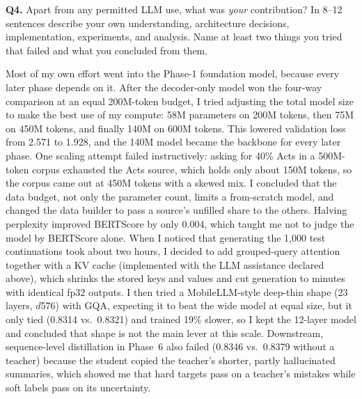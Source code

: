 \documentclass[11pt, oneside]{article}
\begin{document}
\noindent
\textbf{Q4.} Apart from any permitted LLM use, what was \emph{your} contribution? In 8--12 sentences describe your own understanding, architecture decisions, implementation, experiments, and analysis. Name at least two things you tried that failed and what you concluded from them.
\medskip

\noindent
Most of my own effort went into the Phase-1 foundation model, because every later phase depends on it. After the
decoder-only model won the four-way comparison at an equal 200M-token budget, I tried adjusting the total model size
to make the best use of my compute: 58M parameters on 200M tokens, then 75M on 450M tokens, and finally 140M on 600M
tokens. This lowered validation loss from 2.571 to 1.928, and the 140M model became the backbone for every later phase.
One scaling attempt failed instructively: asking for 40\% Acts in a 500M-token corpus exhausted the Acts source, which
holds only about 150M tokens, so the corpus came out at 450M tokens with a skewed mix. I concluded that the data
budget, not only the parameter count, limits a from-scratch model, and changed the data builder to pass a source's
unfilled share to the others. Halving perplexity improved BERTScore by only 0.004, which taught me not to judge the
model by BERTScore alone. When I noticed that generating the 1{,}000 test continuations took about two hours, I
decided to add grouped-query attention together with a KV cache (implemented with the LLM assistance declared above),
which shrinks the stored keys and values and cut generation to minutes with identical fp32 outputs. I then tried a
MobileLLM-style deep-thin shape (23 layers, $d$576) with GQA, expecting it to beat the wide model at equal size, but it
only tied (0.8314 vs.\ 0.8321) and trained 19\% slower, so I kept the 12-layer model and concluded that shape is not
the main lever at this scale. Downstream, sequence-level distillation in Phase~6 also failed (0.8346 vs.\ 0.8379
without a teacher) because the student copied the teacher's shorter, partly hallucinated summaries, which showed me
that hard targets pass on a teacher's mistakes while soft labels pass on its uncertainty.
\medskip

\vspace{1.4cm}


\end{document}
